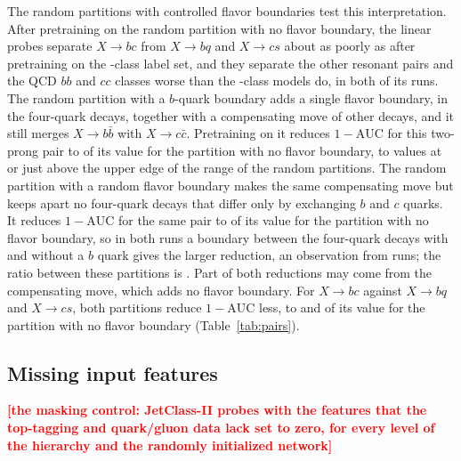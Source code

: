 \documentclass[11pt]{article}
\newcommand{\pending}[1]{\textcolor{red}{\textbf{[#1]}}}
\newcommand{\Kcoarse}{\VocabSizeRonesixQone}
\newcommand{\oma}{\ensuremath{1-\mathrm{AUC}}}
\begin{document}
The random partitions with controlled flavor boundaries test this interpretation. After
pretraining on the random partition with no flavor boundary, the linear probes separate $X\to bc$
from $X\to bq$ and $X\to cs$ about as poorly as after pretraining on the \Kcoarse-class label
set, and they separate the other resonant pairs and the QCD $bb$ and $cc$ classes worse than
the \Kcoarse-class models do, in both of its runs.
The random partition with a $b$-quark boundary adds a single flavor boundary, in the four-quark
decays, together with a compensating move of other decays, and it still merges $X\to b\bar b$
with $X\to c\bar c$. Pretraining on it reduces $\oma$ for this two-prong pair to
\MlstCmpBbFoneOverFzero{} of its value for the partition with no flavor boundary, to values at
or just above the upper edge of the range of the \RandVtwoNPartitions{} random partitions. The random partition with
a random flavor boundary makes the same compensating move but keeps apart no four-quark decays
that differ only by exchanging $b$ and $c$ quarks. It reduces $\oma$ for the same pair to
\MlstCmpBbFonerOverFzero{} of its value for the partition with no flavor boundary, so in both
runs a boundary between the four-quark decays with and without a $b$ quark gives the larger
reduction, an observation from \RandFlavRuns{} runs; the ratio between these partitions is
\MlstCmpBbFonerOverFone. Part of both reductions may come
from the compensating move, which adds no flavor boundary. For $X\to bc$ against $X\to bq$ and
$X\to cs$, both partitions reduce $\oma$ less, to \MlstCmpBcFoneOverFzero{} and
\MlstCmpBcFonerOverFzero{} of its value for the partition with no flavor boundary
(Table~\ref{tab:pairs}).

\subsection{Missing input features}\label{sec:fill}

\pending{the masking control: JetClass-II probes with the features that the top-tagging and
quark/gluon data lack set to zero, for every level of the hierarchy and the randomly initialized
network}
\end{document}
